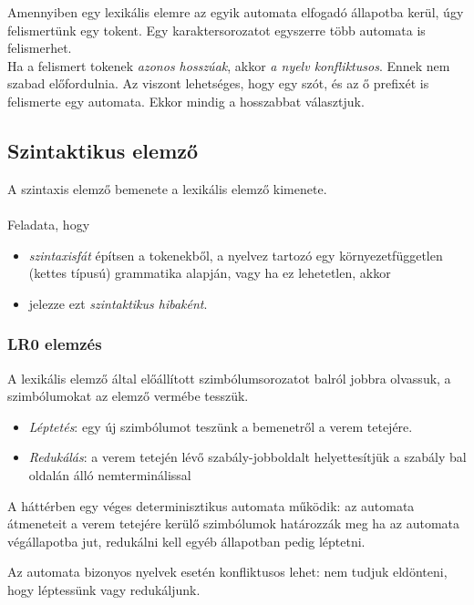 \documentclass[12pt,margin=0px]{article}
\begin{document}
    \noindent Amennyiben egy lexikális elemre az egyik automata elfogadó állapotba kerül, úgy felismertünk egy tokent. Egy karaktersorozatot egyszerre több automata is felismerhet.\\

    \noindent Ha a felismert tokenek \emph{azonos hosszúak}, akkor \emph{a nyelv konfliktusos}. Ennek nem szabad előfordulnia. Az viszont lehetséges, hogy egy szót, és az ő prefixét is felismerte egy automata. Ekkor mindig a hosszabbat választjuk.
	
\subsection*{Szintaktikus elemző}

    A szintaxis elemző bemenete a lexikális elemző kimenete. \\\\
    Feladata, hogy
    \begin{itemize}
        \item \textit{szintaxisfát} építsen a tokenekből, a nyelvez tartozó egy környezetfüggetlen (kettes típusú) grammatika alapján, vagy ha ez lehetetlen, akkor
        \item jelezze ezt \emph{szintaktikus hibaként}.
    \end{itemize}
	
\subsubsection*{LR0 elemzés}
	
	A lexikális elemző által előállított szimbólumsorozatot balról
	jobbra olvassuk, a szimbólumokat az elemző vermébe tesszük.
    \begin{itemize}	
	   \item \emph{Léptetés}: egy új szimbólumot teszünk a bemenetről a verem tetejére.
	   \item \emph{Redukálás}: a verem tetején lévő szabály-jobboldalt helyettesítjük a szabály bal oldalán álló nemterminálissal
	\end{itemize}
	\noindent A háttérben egy véges determinisztikus automata működik:
	az automata átmeneteit a verem tetejére kerülő szimbólumok határozzák meg
	ha az automata végállapotba jut, redukálni kell
	egyéb állapotban pedig léptetni.
	
	\noindent Az automata bizonyos nyelvek esetén konfliktusos lehet: nem tudjuk eldönteni, hogy léptessünk vagy redukáljunk.
	
\end{document}
